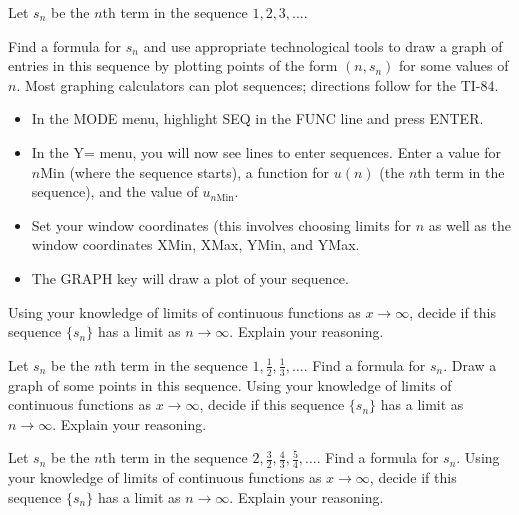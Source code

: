 \begin{activity} \label{7.1.Act1}
\ba
\item Let $s_n$ be the $n$th term in the sequence $1, 2, 3, \ldots$. 

Find a formula for $s_n$ and use appropriate technological tools to draw a graph of entries in this sequence by plotting points of the form $(n,s_n)$ for some values of $n$. Most graphing calculators can plot sequences; directions follow for the TI-84.
\begin{itemize}
\item In the MODE menu, highlight SEQ in the FUNC line and press ENTER.
\item In the Y= menu, you will now see lines to enter sequences. Enter a value for $n$Min (where the sequence starts), a function for $u(n)$ (the $n$th term in the sequence), and the value of $u_{n\text{Min}}$.
\item Set your window coordinates (this involves choosing limits for $n$ as well as the window coordinates XMin, XMax, YMin, and YMax.
\item The GRAPH key will draw a plot of your  sequence.
\end{itemize}
Using your knowledge of limits of continuous functions as $x \to \infty$, decide if this sequence $\{s_n\}$ has a limit as $n \to \infty$. Explain your reasoning.

\item Let $s_n$ be the $n$th term in the sequence $1, \frac{1}{2}, \frac{1}{3}, \ldots$. Find a formula for $s_n$. Draw a graph of some points in this sequence. Using your knowledge of limits of continuous functions as $x \to \infty$, decide if this sequence $\{s_n\}$ has a limit as $n \to \infty$. Explain your reasoning.

\item Let $s_n$ be the $n$th term in the sequence $2, \frac{3}{2}, \frac{4}{3}, \frac{5}{4}, \ldots$. Find a formula for $s_n$. Using your knowledge of limits of continuous functions as $x \to \infty$, decide if this sequence $\{s_n\}$ has a limit as $n \to \infty$. Explain your reasoning.

\ea
\end{activity}

